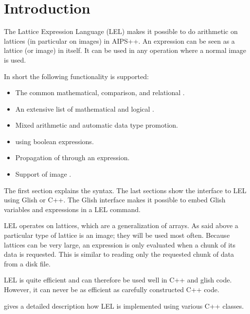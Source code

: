 

\section{Introduction}
The Lattice Expression Language (LEL) makes it possible to do
arithmetic on lattices (in particular on images) in AIPS++.
An expression can be seen as a lattice (or image) in itself. It
can be used in any operation where a normal image is used.

In short the following functionality is supported:
\begin{itemize}
\item The common mathematical, comparison, and relational
      .
\item An extensive list of mathematical and logical
      .
\item Mixed  arithmetic
      and automatic data type promotion.
\item {} using boolean expressions.
\item Propagation of  through an expression.
\item Support of image .
\end{itemize}

The first section explains the syntax.
The last sections show the interface to LEL using Glish or C++.
The Glish interface makes it possible to embed Glish
variables and expressions in a LEL command.

LEL operates on lattices, which are a generalization of arrays.
As said above a particular type of lattice is an image; they
will be used most often.
Because lattices can be very large, an expression is only evaluated
when a chunk of its data is requested. This is similar to reading
only the requested chunk of data from a disk file.

LEL is quite efficient and can therefore be used well in
C++ and glish code. However, it can never be as efficient as
carefully constructed C++ code. 

 gives a detailed
description how LEL is implemented using various C++ classes.


